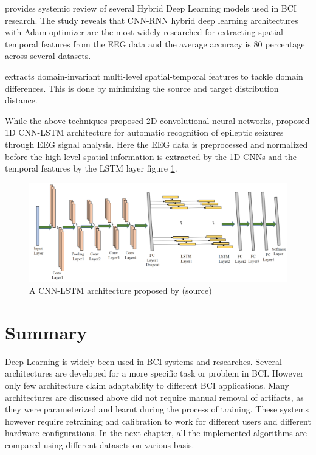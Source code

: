 \cite{2021_hDL_BCI} provides  systemic review of several Hybrid Deep Learning models used in BCI research. The study reveals that CNN-RNN hybrid deep learning architectures with Adam optimizer are the most widely researched for extracting spatial-temporal features from the EEG data and the average accuracy is 80 percentage across several datasets. 

\cite{2022_MI_DL_Multilevel} extracts domain-invariant multi-level spatial-temporal features to tackle domain differences. This is done by minimizing the source and target distribution distance.

While the above techniques proposed 2D convolutional neural networks, \cite{2020_DL_LSTM_EEG} proposed 1D CNN-LSTM architecture for automatic recognition of epileptic seizures through EEG signal analysis. Here the EEG data is preprocessed and normalized before the high level spatial information is extracted by the 1D-CNNs and the temporal features by the LSTM layer figure \ref{fig:2020_DL_LSTM_EEG_arch}.

    \begin{figure}[H] 
    \begin{center}
         \includegraphics[width=1\textwidth]{images/2020_DL_LSTM_EEG_arch.png}
        \caption{A CNN-LSTM architecture proposed by \cite{2020_DL_LSTM_EEG}(source)}
        \label{fig:2020_DL_LSTM_EEG_arch}       
    \end{center}
    \end{figure}
    
\section{Summary}
Deep Learning is widely been used in BCI systems and researches. Several architectures are developed for a more specific task or problem in BCI. However only few architecture claim adaptability to different BCI applications. Many architectures are discussed above did not require manual removal of artifacts, as they were parameterized and learnt during the process of training. These systems however require retraining and calibration to work for different users and different hardware configurations. In the next chapter, all the implemented algorithms are compared using different datasets on various basis.